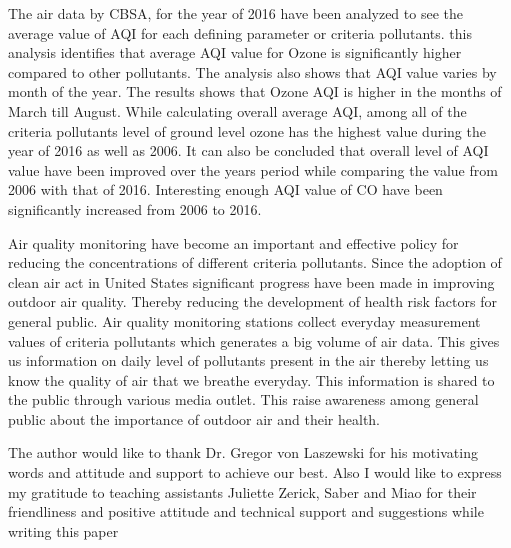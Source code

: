 \documentclass[sigconf]{acmart}
\begin{document}
   The  air data by CBSA, for the year of 2016  have been analyzed to see the average value of AQI for each defining parameter or criteria pollutants. this analysis identifies that average AQI value for Ozone is significantly higher compared to other pollutants. The analysis also shows that AQI value varies by month of the year. The results shows that Ozone AQI is higher in the months of March till August. While calculating overall average AQI, among all of the criteria pollutants level of ground level ozone has the highest value during the year of 2016 as well as 2006. It can also be concluded that overall level of AQI value have been improved over the years period while comparing the value from 2006 with that of 2016. Interesting enough AQI value of CO have been significantly increased from 2006 to 2016.
   
   Air quality monitoring have become an important and effective policy for reducing the concentrations of different criteria pollutants. Since the adoption of clean air act 
   in United States significant progress have been made in improving outdoor air quality.
   Thereby reducing the development of health risk factors for general public. Air quality monitoring stations collect everyday measurement values of criteria pollutants which generates a big volume of air data. This gives us information on daily level of pollutants present in the air thereby letting us know the quality of air that we breathe everyday. This information is shared to the public through various media outlet. This raise awareness among general public
   about the importance of outdoor air and their health.
   
  
  
\begin{acks}

  The author would like to thank Dr. Gregor von Laszewski for his motivating words and attitude and support to achieve our best. Also I would like to express my gratitude to teaching assistants Juliette Zerick, Saber and Miao for their friendliness and positive attitude and technical support and suggestions while writing this paper
  

\end{acks}


 
\end{document}
